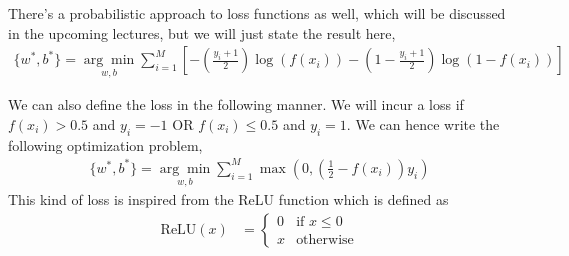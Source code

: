 \documentclass[12pt]{article}
\begin{document}
There's a probabilistic approach to loss functions as well, which will be discussed in the upcoming lectures, but we will just state the result here,
\begin{align*}
    \{w^{*}, b^{*}\} = \underset{w, b}{\arg\min} \sum_{i=1}^{M}\left [ -\left (\frac{y_i+1}{2}\right )\log(f(x_i))-\left (1-\frac{y_i+1}{2}\right )\log(1-f(x_i))\right ]
\end{align*}

We can also define the loss in the following manner. We will incur a loss if $f(x_i)>0.5$ and $y_i=-1$ OR $f(x_i) \le 0.5$ and $y_i = 1$. We can hence write the following optimization problem,
\begin{align*}
    \{w^{*}, b^{*}\} = \underset{w, b}{\arg\min} \sum_{i=1}^{M} \max \left (0, \left ( \frac{1}{2} - f(x_i)\right )y_i\right) 
\end{align*}
This kind of loss is inspired from the ReLU function which is defined as \\
\begin{align}
 \text{ReLU}(x) &=
  \begin{cases}
   0        & \text{if } x \leq 0 \\
   x        & \text{otherwise}
  \end{cases}
 \end{align}
%


\end{document}
